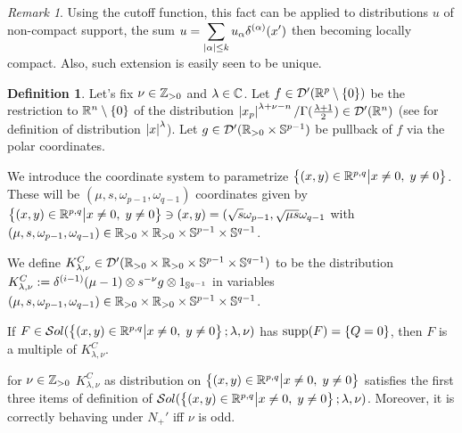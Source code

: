 \documentclass[10pt]{article} %
\newcommand{\D}{\mathcal{D}}
\theoremstyle{definition}
\newtheorem{mydef}{Definition}[section]
\theoremstyle{remark}
\newtheorem*{remark}{Remark}
\begin{document}
\begin{remark}
	Using the cutoff function, this fact can be applied to distributions $u$ of non-compact support, the sum 
	$u=\sum_{\myabs{\alpha}\leq k}u_{\alpha}\delta^{(\alpha)}(x')$
	then becoming locally compact. Also, such extension is easily seen to be unique.
\end{remark}
\begin{mydef}
	Let's fix $\nu\in\Z_{>0}$ and $\lambda\in\C$. Let $f\in\D'(\R^p\setminus\left\{ 0 \right\})$ be the restriction to 
	$\R^n\setminus\left\{ 0 \right\}$ of the distribution $\myabs{x_p}^{\lambda+\nu-n}/\Gamma(\frac{\lambda+1}{2})\in\D'(\R^n)$
	(see \cite[ch. III, sec. 3.2, 3.3]{gelfand1980distribution} for definition of distribution $\myabs{x}^\lambda$).
	Let $g\in\D'(\R_{>0}\times\Sp^{p-1})$ be pullback of $f$ via the polar coordinates.

	We introduce the coordinate system to parametrize $\Upp$.
	These will be $(\mu,s,\omega_{p-1},\omega_{q-1})$ coordinates given by $\mysetn{(x,y)\in\R^{p,q}}{
	x\neq0,\;y\neq0}\ni(x,y)=(\sqrt{s}\omega_{p-1},\sqrt{\mu s}\omega_{q-1}$ with $(\mu,s,\omega_{p-1},\omega_{q-1})\in
	\R_{>0}\times\R_{>0}\times \Sp^{p-1}\times\Sp^{q-1}$.

	We define $K^C_{\lambda,\nu}\in\D'(\R_{>0}\times\R_{>0}\times\Sp^{p-1}\times\Sp^{q-1})$ to be the distribution
	$K^C_{\lambda,\nu}:=\delta^{(i-1)}(\mu-1)\otimes s^{-\nu}g\otimes 1_{\Sp^{q-1}}
	$ in variables $(\mu,s,\omega_{p-1},\omega_{q-1})\in\R_{>0}\times\R_{>0}\times\Sp^{p-1}\times\Sp^{q-1}$.
\end{mydef}
\begin{mylem}
	\label{lem:sing_q_6}
	If $F\in\sol[\Upp]$ has $\supp(F)=\left\{ Q=0 \right\}$,
	then $F$ is a multiple of $K^C_{\lambda,\nu}$.
\end{mylem}
\begin{mylem}
	\label{lem:sing_q_7}
	for $\nu\in\Z_{>0}$
	$K^C_{\lambda,\nu}$ as distribution on $\Upp$ satisfies the first three items of definition of $\sol[\Upp]$.
	Moreover, it
	is correctly behaving under $N_+'$ iff $\nu$ is odd.
\end{mylem}
\end{document}
